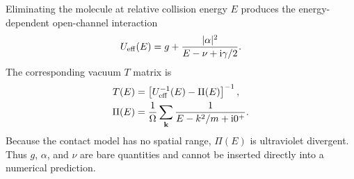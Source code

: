 \documentclass[9pt,a4paper,twocolumn,twoside]{rho-class/rho}
\newcommand{\ii}{\mathrm{i}}
\begin{document}
        Eliminating the molecule at relative collision energy $E$ produces the
        energy-dependent open-channel interaction
        \begin{equation}
            U_{\rm eff}(E)=g+
            \frac{|\alpha|^2}{E-\nu+\ii\gamma/2}.
            \label{eq:appendix-effective-interaction}
        \end{equation}
        The corresponding vacuum $T$ matrix is
        \begin{align}
            T(E)&=\left[U_{\rm eff}^{-1}(E)-\Pi(E)\right]^{-1},
            \label{eq:appendix-t-matrix}\\
            \Pi(E)&=\frac{1}{\Omega}\sum_{\mathbf k}
            \frac{1}{E-k^2/m+\ii0^+}.
            \label{eq:appendix-pair-propagator}
        \end{align}
        Because the contact model has no spatial range, $\Pi(E)$ is ultraviolet
        divergent.  Thus $g$, $\alpha$, and $\nu$ are bare quantities and
        cannot be inserted directly into a numerical prediction.
\end{document}
